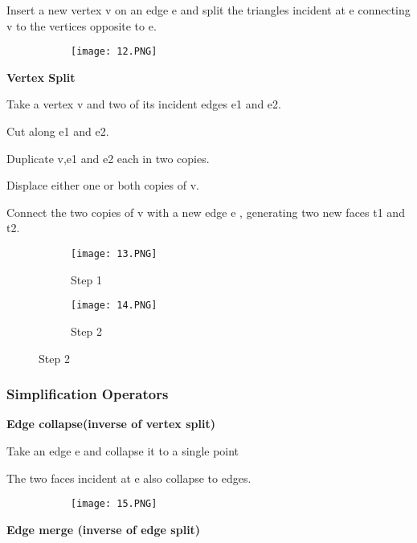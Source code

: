 \documentclass{article}
\begin{document}
Insert a new vertex v on an edge e and split the triangles incident at e connecting v to the vertices opposite to e.

\begin{figure}[ht!]
  \centering
  \begin{subfigure}[b]{0.4\linewidth}
    \texttt{[image: 12.PNG]}
  \end{subfigure}
\end{figure}

\textbf{Vertex Split}

Take a vertex v and two of its incident edges e1 and e2.

Cut along e1 and e2.

Duplicate v,e1 and e2 each in two copies.

Displace either one or both copies of v.

Connect the two copies of v with a new edge e , generating two new faces t1 and t2.

\begin{figure}[ht!]
  \centering
  \begin{subfigure}[b]{0.5\linewidth}
    \texttt{[image: 13.PNG]}
    \caption{Step 1}
  \end{subfigure}
     \begin{subfigure}[b]{0.49\textwidth}
         \centering
         \texttt{[image: 14.PNG]}
         \caption{Step 2}
     \end{subfigure}
\end{figure}

\vspace{30mm}

\subsubsection{Simplification Operators}

\textbf{Edge collapse(inverse of vertex split)}

Take an edge e and collapse it to a single point

The two faces incident at e also collapse to edges.

\begin{figure}[ht!]
  \centering
  \begin{subfigure}[b]{0.4\linewidth}
    \texttt{[image: 15.PNG]}
  \end{subfigure}
\end{figure}

\textbf{Edge merge (inverse of edge split)}
\end{document}
